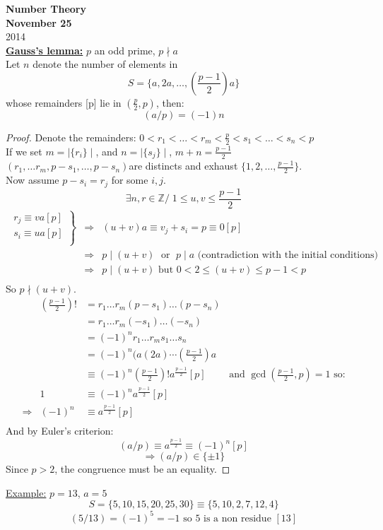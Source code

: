 \documentclass{report}
\begin{document}
{\centering
\Large
\textbf{Number Theory}\\
\normalsize
\textbf{November 25}\\
2014\\
}
\vspace{10mm}
\underline{\textbf{Gauss's lemma:}} $p$ an odd prime, $p\nmid a$\\
																		Let $n$ denote the number of elements in \[ S=\{a,2a,\dots,({\scriptstyle \frac{p-1}{2}})a\}\] whose remainders [p] lie in $(\frac{p}{2},p)$, then: \[(a/p)=(-1)n\]
\begin{proof} Denote the remainders:   $0<r_1<\dots<r_m<\frac{p}{2}<s_1<\dots<s_n<p$\\
							If we set $m=\mid\{r_i\}\mid$, and $n=\mid \{s_j\} \mid$,   $m+n=\frac{p-1}{2}$\\
							$(r_1,\dots r_m, p-s_1,\dots,p-s_n)$are distincts and exhaust $\{1,2,\dots,\frac{p-1}{2}\}$.\\
							Now assume $p-s_i=r_j$ for some $i,j$.
							\[\exists  n,r \in \mathbb{Z}/\;1\leq u,v \leq \frac{p-1}{2} \]
							\[\begin{array}{lcl}\left.									
																	\begin{array}{rrr}
																	r_j\equiv va[p]\\
																	s_i\equiv ua[p]\\
																	\end{array}
																	\right \}
																	&\Rightarrow& (u+v)a\equiv v_j+s_i=p\equiv 0[p]\\
																	&\Rightarrow& p\mid (u+v) \; \text{ or }\; p\mid a \text{ (contradiction with the initial conditions)}\\
																	&\Rightarrow& p\mid (u+v) \text{ but } 0<2\leq (u+v) \leq p-1 < p\\
								\end{array}\]
								So $p\nmid (u+v)$.
								\[\begin{array}{rrl}
								&(\frac{p-1}{2})!&=r_1\dots r_m(p-s_1)\dots(p-s_n)\\
																&&=r_1\dots r_m(-s_1)\dots(-s_n)\\
																&&=(-1)^nr_1\dots r_ms_1\dots s_n\\
																&&=(-1)^n(a(2a)\cdots(\frac{p-1}{2})a\\
																&&\equiv(-1)^n(\frac{p-1}{2})!a^\frac{p-1}{2}[p]\qquad \text{ and } \gcd(\frac{p-1}{2},p)=1\text{  so:}\\
															&1& \equiv (-1)^na^\frac{p-1}{2}[p]\\
															\Rightarrow &(-1)^n&\equiv a^\frac{p-1}{2}[p]\\
									\end{array}\]
								And by Euler's criterion:\[(a/p)\equiv a^\frac{p-1}{2}\equiv (-1)^n[p]\]
																					\[\Rightarrow (a/p) \in \{\pm 1\}\]
								Since $p>2$, the congruence must be an equality.
\end{proof}
\underline{Example:} $p=13$, $a=5$\\
										 \[S=\{5,10,15,20,25,30\}\equiv \{5,10,2,7,12,4\}\]
										 \[(5/13)=(-1)^5=-1 \text{ so 5 is a non residue }[13]\]
\end{document}
